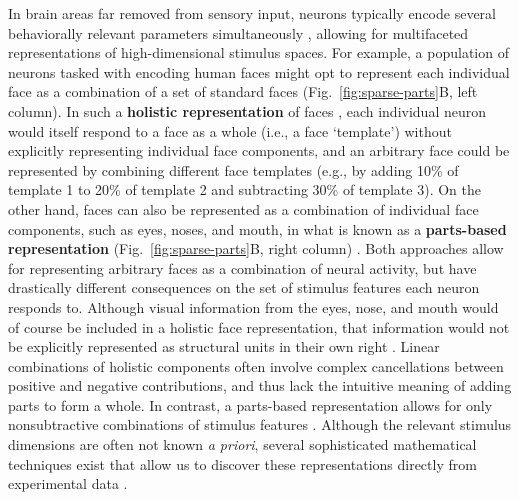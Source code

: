 In brain areas far removed from sensory input,
neurons typically encode several behaviorally relevant parameters
simultaneously \cite{Rigotti2013,Park2014,PaganRust2014,PougetSejnowski1997},
allowing for multifaceted representations of high-dimensional stimulus spaces.
For example, a population of neurons tasked with encoding human faces
might opt to represent each individual face as a combination of a set of
standard faces (Fig.~\ref{fig:sparse-parts}B, left column).
In such a \textbf{holistic representation} of faces \cite{TanakaFarah1993},
each individual neuron would itself respond to a face as a whole
(i.e., a face `template')
without explicitly representing individual face components,
and an arbitrary face could be represented by 
combining different face templates
(e.g., by adding 10\% of template 1 to 20\% of template 2
and subtracting 30\% of template 3).
On the other hand, faces can also be represented as a combination
of individual face components, such as eyes, noses, and mouth,
in what is known as a \textbf{parts-based representation}
(Fig.~\ref{fig:sparse-parts}B, right column) .
Both approaches allow for representing arbitrary faces as a combination of
neural activity, but have drastically different consequences on the
set of stimulus features each neuron responds to.
Although visual information from the eyes, nose, and mouth would of course be
included in a holistic face representation,
that information would not be explicitly represented as structural units
in their own right \cite{TanakaFarah1993}.
Linear combinations of holistic components often involve complex cancellations
between positive and negative contributions,
and thus lack the intuitive meaning of adding parts to form a whole.
In contrast, a parts-based representation allows for only nonsubtractive
combinations of stimulus features \cite{Palmer1977}.
Although the relevant stimulus dimensions are often not known \emph{a priori},
several sophisticated mathematical techniques exist that
allow us to discover these representations directly from experimental data
\cite{Brunton2016,CunninghamYu2014,PillowSimoncelli2006,Sharpee2014,Gao2017,ChangTsao2017}.

